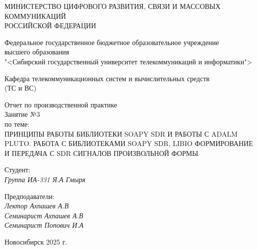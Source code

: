 \thispagestyle{empty}

\begin{center}
    МИНИСТЕРСТВО ЦИФРОВОГО РАЗВИТИЯ, СВЯЗИ И МАССОВЫХ КОММУНИКАЦИЙ \\ РОССИЙСКОЙ ФЕДЕРАЦИИ

    \vspace{20pt}

    Федеральное государственное бюджетное образовательное учреждение  \\  высшего образования \\
    "<Сибирский государственный университет телекоммуникаций и информатики"> \\

    \vspace{20pt}

    Кафедра телекоммуникационных систем и вычислительных средств \\  (ТС и ВС)
\end{center}

\vfill

\begin{center}
    Отчет по производственной практике \\  
    Занятие №3 \\
    \vspace{20pt}
    по теме: \\
    \uppercase{Принципы работы библиотеки Soapy SDR и работы с Adalm Pluto. Работа с библиотеками Soapy SDR, Libio  
    Формирование и передача с SDR сигналов произвольной формы}
\end{center}

\vfill

    \noindent Студент: \\
    \textit{Группа ИА-331 \hfill Я.А Гмыря}

    \vspace{20pt}

    \noindent Предподаватели: \\
    \textit{Лектор \hfill Ахпашев А.В} \\
    \textit{Семинарист \hfill Ахпашев А.В} \\
    \textit{Семинарист \hfill Попович И.А}

\vfill

\begin{center}
    Новосибирск 2025 г.
\end{center}